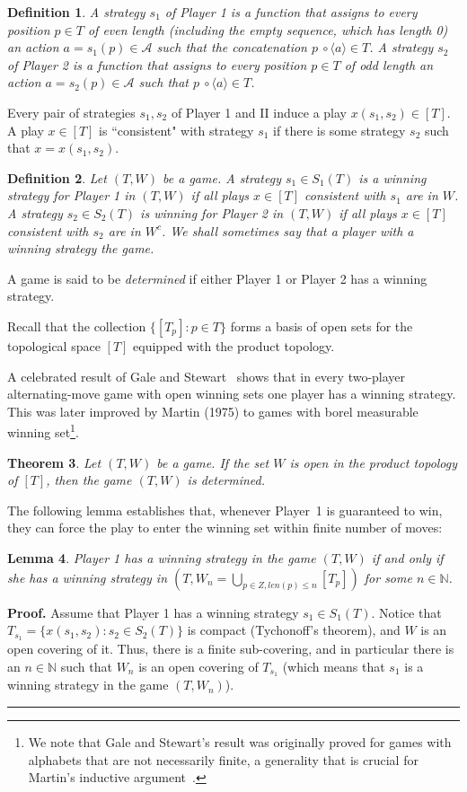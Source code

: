 \documentclass[a4,12pt]{article}%
\newtheorem{theorem}{Theorem}[section]
\newtheorem{definition}[theorem]{Definition}
\newtheorem{lemma}[theorem]{Lemma}
\newenvironment{proof}[1][Proof]{\textbf{#1.} }{\ \rule{0.5em}{0.5em}}
\newcommand{\N}{\mathbb{N}}
\begin{document}
\begin{definition}
    A \emph{strategy} $s_1$ of Player 1 is a function that assigns to every position $p \in T$ of even length (including the empty sequence, which has length 0) an action $a = s_1(p) \in \mathcal{A}$ such that the concatenation $p \ \circ \langle a \rangle \in T$. A \emph{strategy} $s_2$ of Player 2 is a function that assigns to every position $p \in T$ of odd length an action $a = s_2(p) \in \mathcal{A}$ such that $p \ \circ \langle a \rangle \in T$.
\end{definition}
Every pair of strategies $s_1,s_2$ of Player 1 and II induce a play $x(s_1,s_2) \in [T]$. A play $x\in [T]$ is “consistent" with strategy $s_1$ if there is some strategy $s_2$ such that $x = x(s_1,s_2)$. 
\begin{definition}
Let $(T, W)$ be a game. A strategy
$s_1 \in S_1(T)$ is a \emph{winning strategy} for Player 1 in $(T,W)$ if all plays $x \in [T]$ consistent with $s_1$ are in $W$. A strategy $s_2 \in S_2(T)$ is \emph{winning} for Player 2 in $(T,W)$ if all plays $x \in [T]$ consistent with $s_2$ are in $W^c$.
We shall sometimes say that a player with a winning strategy  the game.
\end{definition}
A game is said to be \emph{determined} if either Player 1 or Player 2 has a winning strategy.

Recall that the collection $\{ [T_p] : p \in T \}$ forms a basis of open sets for the topological space $[T]$ equipped with the product topology. 

A celebrated result of Gale and Stewart~\cite{GaleStewartOpenDET} shows that in every two-player alternating-move game with open winning sets one player has a winning strategy. This was later improved by Martin (1975) to games with borel measurable winning set\footnote{We note that Gale and Stewart's result was originally proved for games with alphabets that are not necessarily finite, a generality that is crucial for Martin's inductive argument~\cite{MartinCovering}.}.
\begin{theorem}
    Let $(T, W)$ be a game. If the set $W$ is
    open in the product topology of $[T]$, then the game $(T, W)$ is determined.
\end{theorem}

The following lemma establishes that, whenever Player~1 is guaranteed to win, they can force the play to enter the winning set within finite number of moves:
\begin{lemma} \label{lemma:win in open mean finite win}
    Player 1  has a winning strategy in the game $(T,W)$ if and only if she has a winning strategy in $(T,W_n = \bigcup_{p\in Z , len(p)\leq n}[T_p])$ for some $n\in \N$.
\end{lemma}
\begin{proof}
    Assume that Player 1  has a winning strategy $s_1 \in S_1(T)$. Notice that $T_{s_1}=\{x(s_1,s_2): s_2 \in S_2(T)\}$ is compact (Tychonoff's theorem), and $W$ is an open covering of it. Thus, there is a finite sub-covering, and in particular there is an $n\in \N$ such that $W_n$ is an open covering of $T_{s_1}$ (which means that $s_1$ is a winning strategy in the game $(T,W_n)$).
\end{proof}
\end{document}
